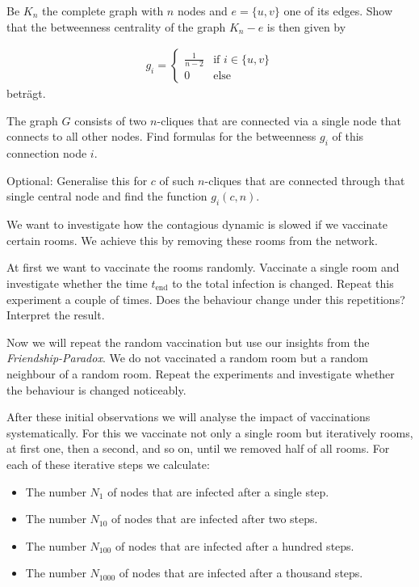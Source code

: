 Be $K_n$ the complete graph with $n$ nodes and $e=\{u,v\}$ one of its edges. Show that the betweenness centrality of the graph  $K_n - e$ is then given by
		
\begin{align}
g_i = \begin{cases} \frac{1}{n-2} &\mbox{if } i \in \{u,v\} \\ 
0 & \mbox{else } \end{cases} 
\end{align} 
betr\"agt.

\subexercise[%
  topic= Betweenness Centrality of two connected $n$-Cliques,
    ]


The graph $G$ consists of two $n$-cliques that are connected via a single node that connects to all other nodes. Find formulas for the betweenness $g_i$ of this connection node $i$.

Optional: Generalise this for $c$ of such $n$-cliques that are connected through that single central node and find the function  $g_i(c,n)$.

%
		
\exercise[%
  topic =  Contagion Dynamic -- Vaccination
    ]

We want to investigate how the contagious dynamic is slowed if we vaccinate certain rooms. We achieve this by removing these rooms from the network.

\subexercise[%
  topic= Random Vaccination,
    ]
\label{impfung}


At first we want to vaccinate the rooms randomly. Vaccinate a single room and investigate whether the time $t_{\mathrm{end}}$ to the total infection is changed. Repeat this experiment a couple of times. Does the behaviour change under this repetitions? Interpret the result.


\subexercise[%
  topic= Random Next Neighbour Vaccination,
    ]

Now we will repeat the random vaccination but use our insights from the \emph{Friendship-Paradox}. We do not vaccinated a random room but a random neighbour of a random room. Repeat the experiments and investigate whether the behaviour is changed noticeably.

\subexercise[%
  topic= Systematic Investigation of the Vaccination Success,
    ]

After these initial observations we will analyse the impact of vaccinations systematically. For this we vaccinate not only a single room but iteratively rooms, at first one, then a second, and so on, until we removed half of all rooms. For each of these iterative steps we calculate:
\begin{itemize}
\item The number $N_{1}$ of nodes that are infected after a single step.
\item The number $N_{10}$ of nodes that are infected after two steps.
\item The number $N_{100}$ of nodes that are infected after a hundred steps.
\item The number $N_{1000}$ of nodes that are infected after a thousand steps.
\end{itemize}


